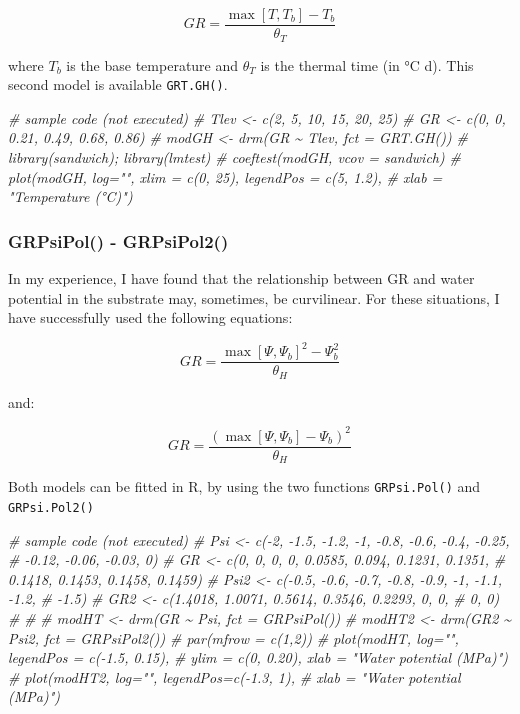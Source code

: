 \documentclass[
]{book}
\newenvironment{Shaded}{\begin{snugshade}}{\end{snugshade}}
\newcommand{\CommentTok}[1]{\textcolor[rgb]{0.56,0.35,0.01}{\textit{#1}}}
\begin{document}
\[GR = \frac{\max \left[T, T_b\right] - T_b}{\theta_T}\]

where \(T_b\) is the base temperature and \(\theta_T\) is the thermal time (in °C d). This second model is available \texttt{GRT.GH()}.

\begin{Shaded}
\begin{Highlighting}[]
\CommentTok{\# sample code (not executed)}
\CommentTok{\# Tlev \textless{}{-} c(2, 5, 10, 15, 20, 25)}
\CommentTok{\# GR \textless{}{-} c(0, 0, 0.21, 0.49, 0.68, 0.86)}
\CommentTok{\# modGH \textless{}{-} drm(GR \textasciitilde{} Tlev, fct = GRT.GH())}
\CommentTok{\# library(sandwich); library(lmtest)}
\CommentTok{\# coeftest(modGH, vcov = sandwich)}
\CommentTok{\# plot(modGH, log="", xlim = c(0, 25), legendPos = c(5, 1.2),}
\CommentTok{\#      xlab = "Temperature (°C)")}
\end{Highlighting}
\end{Shaded}

\hypertarget{grpsipol---grpsipol2}{%
\subsubsection{GRPsiPol() - GRPsiPol2()}\label{grpsipol---grpsipol2}}

In my experience, I have found that the relationship between GR and water potential in the substrate may, sometimes, be curvilinear. For these situations, I have successfully used the following equations:

\[GR = \frac{\max\left[\Psi,\Psi_b\right]^2 - \Psi^2_b}{\theta_H}\]

and:

\[GR = \frac{\left(\max\left[\Psi, \Psi_b\right] - \Psi_b \right)^2}{ \theta_H }\]

Both models can be fitted in R, by using the two functions \texttt{GRPsi.Pol()} and \texttt{GRPsi.Pol2()}

\begin{Shaded}
\begin{Highlighting}[]
\CommentTok{\# sample code (not executed)}
\CommentTok{\# Psi \textless{}{-} c({-}2, {-}1.5, {-}1.2, {-}1, {-}0.8, {-}0.6, {-}0.4, {-}0.25,}
\CommentTok{\#          {-}0.12, {-}0.06, {-}0.03, 0)}
\CommentTok{\# GR \textless{}{-} c(0, 0, 0, 0, 0.0585, 0.094, 0.1231, 0.1351,}
\CommentTok{\#         0.1418, 0.1453, 0.1458, 0.1459)}
\CommentTok{\# Psi2 \textless{}{-} c({-}0.5, {-}0.6, {-}0.7, {-}0.8, {-}0.9, {-}1, {-}1.1, {-}1.2,}
\CommentTok{\#           {-}1.5)}
\CommentTok{\# GR2 \textless{}{-} c(1.4018, 1.0071, 0.5614, 0.3546, 0.2293, 0, 0,}
\CommentTok{\#          0, 0)}
\CommentTok{\# }
\CommentTok{\# }
\CommentTok{\# modHT \textless{}{-} drm(GR \textasciitilde{} Psi, fct = GRPsiPol())}
\CommentTok{\# modHT2 \textless{}{-} drm(GR2 \textasciitilde{} Psi2, fct = GRPsiPol2())}
\CommentTok{\# par(mfrow = c(1,2))}
\CommentTok{\# plot(modHT, log="", legendPos = c({-}1.5, 0.15), }
\CommentTok{\#      ylim = c(0, 0.20), xlab = "Water potential (MPa)")}
\CommentTok{\# plot(modHT2, log="", legendPos=c({-}1.3, 1), }
\CommentTok{\#      xlab = "Water potential (MPa)")}
\end{Highlighting}
\end{Shaded}
\end{document}
